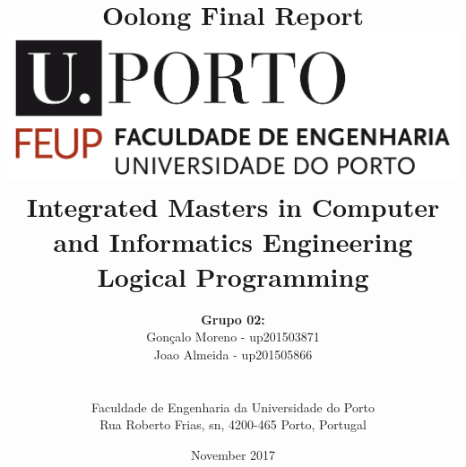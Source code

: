 \documentclass[a4paper]{article}
\begin{document}
\setlength{\textwidth}{16cm}
\setlength{\textheight}{22cm}

\title{\Huge\textbf{Oolong}\linebreak\linebreak\linebreak
\Large\textbf{Final Report}\linebreak\linebreak
\linebreak\linebreak
\includegraphics[scale=0.1]{feup-logo.png}\linebreak\linebreak
\linebreak\linebreak
\Large{Integrated Masters in Computer and Informatics Engineering} \linebreak\linebreak
\Large{Logical Programming}\linebreak
}

\author{\textbf{Grupo 02:}\\ Gonçalo Moreno - up201503871 \\ Joao Almeida - up201505866 \\\linebreak\linebreak \\
 \\ Faculdade de Engenharia da Universidade do Porto \\ Rua Roberto Frias, s\/n, 4200-465 Porto, Portugal \linebreak\linebreak\linebreak
\linebreak\linebreak\vspace{1cm}}
\date{November 2017}
\maketitle
\thispagestyle{empty}

\end{document}
